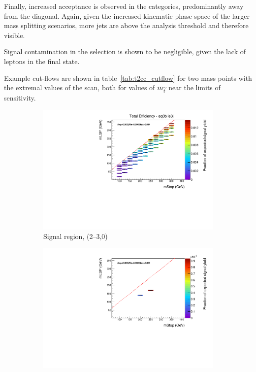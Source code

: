 Finally, increased acceptance is observed in the \njhigh categories, 
predominantly away from the diagonal. Again, given the increased kinematic phase
space of the larger mass splitting scenarios, more jets are above the analysis
threshold and therefore visible.


Signal contamination in the \mj selection is shown to be negligible, given the 
lack of leptons in the final state.

Example cut-flows are shown in table~\ref{tab:t2cc_cutflow} for two mass points
with the extremal \deltam values of the scan, both for values of $m_{\widetilde{t}}$
near the limits of sensitivity.

\begin{figure}[p]
  \centering
  \begin{subfigure}[b]{0.47\textwidth}
    \includegraphics[width=\textwidth]{Figs/sms/t2cc/v37/effs/T2cc_had_eff_maps_eq0b_le3j_SITV.pdf}
    \caption{Signal region, (2--3,0)}
    \label{fig:t2cc_sig_eff_le3j_0b}
  \end{subfigure}
  \begin{subfigure}[b]{0.47\textwidth}
    \includegraphics[width=\textwidth]{Figs/sms/t2cc/v37/effs/T2cc_muon_eff_maps_eq0b_le3j_SITV.pdf}

\end{subfigure}
\end{figure}
